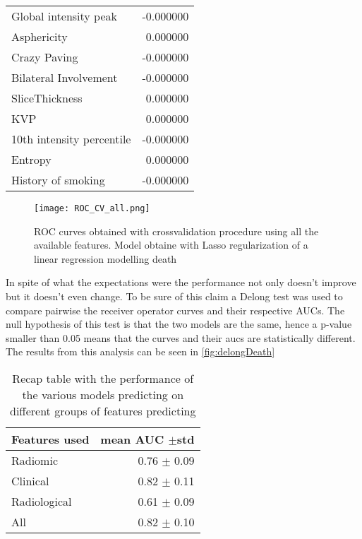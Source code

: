 \begin{table}
\begin{tabular}{lr}
			Global intensity peak               &                     -0.000000 \\
			Asphericity                         &                      0.000000 \\
			Crazy Paving                        &                     -0.000000 \\
			Bilateral Involvement               &                     -0.000000 \\
			SliceThickness                      &                      0.000000 \\
			KVP                                 &                      0.000000 \\
			10th intensity percentile           &                     -0.000000 \\
			Entropy                             &                      0.000000 \\
			History of smoking                  &                     -0.000000 \\
			\bottomrule
\end{tabular}
\end{table}

\begin{figure}[htbp]
	\centering
  		\texttt{[image: ROC\_CV\_all.png]}
        \caption{ROC curves obtained with crossvalidation procedure using all the available features. Model obtaine with Lasso regularization of a linear regression modelling death\label{fig:RocDeathAll}}
\end{figure}

In spite of what the expectations were the performance not only doesn't improve but it doesn't even change. To be sure of this claim a Delong test was used to compare pairwise the receiver operator curves and their respective AUCs. The null hypothesis of this test is that the two models are the same, hence a p-value smaller than 0.05 means that the curves and their aucs are statistically different. The results from this analysis can be seen in \ref{fig:delongDeath}

\begin{table}
\caption{Recap table with the performance of the various models predicting on different groups of features predicting \death \label{tab:RecapDeath}}
\centering
\begin{tabular}{l|r}
\toprule
Features used & mean AUC $\pm$std\\
\midrule
Radiomic  & 0.76 $\pm$ 0.09\\
Clinical  &  0.82 $\pm$ 0.11\\
Radiological & 0.61 $\pm$ 0.09\\
All & 0.82 $\pm$ 0.10 \\
\bottomrule
\end{tabular}
\end{table}


